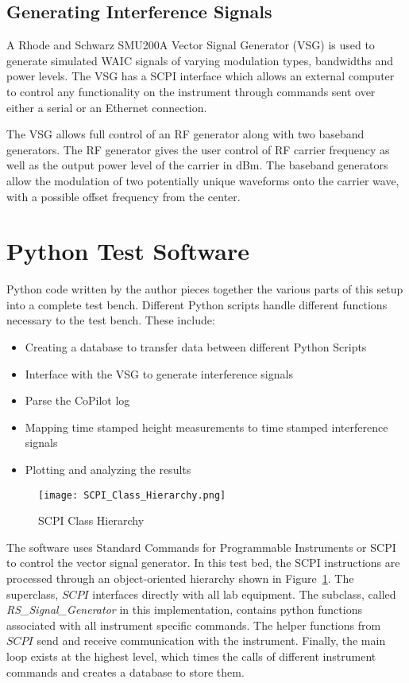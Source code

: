 \subsection{Generating Interference Signals}
A Rhode and Schwarz SMU200A Vector Signal Generator (VSG) is used to generate simulated WAIC signals of varying modulation types, bandwidths and power levels. The VSG has a SCPI interface which allows an external computer to control any functionality on the instrument through commands sent over either a serial or an Ethernet connection. 

The VSG allows full control of an RF generator along with two baseband generators. The RF generator gives the user control of RF carrier frequency as well as the output power level of the carrier in dBm. The baseband generators allow the modulation of two potentially unique waveforms onto the carrier wave, with a possible offset frequency from the center. 

\section{Python Test Software}


Python code written by the author pieces together the various parts of this setup into a complete test bench. Different Python scripts handle different functions necessary to the test bench. These include:

\begin{itemize}
\item Creating a database to transfer data between different Python Scripts
\item Interface with the VSG to generate interference signals
\item Parse the CoPilot log
\item Mapping time stamped height measurements to time stamped interference signals
\item Plotting and analyzing the results
\end{itemize}

\begin{figure}[ht]
\centering
\texttt{[image: SCPI\_Class\_Hierarchy.png]}
\caption[]{SCPI Class Hierarchy}

\label{fig:SCPI}

\end{figure}
The software uses Standard Commands for Programmable Instruments or SCPI to control the vector signal generator. In this test bed, the SCPI instructions are processed through an object-oriented hierarchy shown in Figure~\ref{fig:SCPI}. The superclass, $SCPI$ interfaces directly with all lab equipment. The subclass, called \textit{RS\_Signal\_Generator} in this implementation, contains python functions associated with all instrument specific commands. The helper functions from $SCPI$ send and receive communication with the instrument. Finally, the main loop exists at the highest level, which times the calls of different instrument commands and creates a database to store them. 

